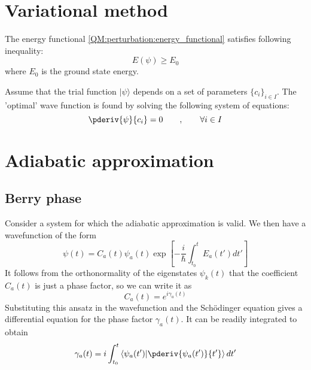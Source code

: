\section{Variational method}

    \begin{property}
    	The energy functional \ref{QM:perturbation:energy_functional} satisfies following inequality:
        \begin{equation}
        	E(\psi) \geq E_0
        \end{equation}
        where $E_0$ is the ground state energy.
    \end{property}
    
    \begin{method}
    	Assume that the trial function $|\psi\rangle$ depends on a set of parameters $\{c_i\}_{i\in I}$. The 'optimal' wave function is found by solving the following system of equations:
        \begin{equation}
        	\pderiv{\psi}{c_i} = 0\qquad,\qquad\forall i\in I
        \end{equation}
    \end{method}
    
\section{Adiabatic approximation}

	\subsection{Berry phase}
    	Consider a system for which the adiabatic approximation is valid. We then have a wavefunction of the form
        \begin{equation}
        	\psi(t) = C_a(t)\psi_a(t)\exp\left[-\frac{i}{\hbar}\int_{t_0}^tE_a(t')dt'\right]
        \end{equation}
    	It follows from the orthonormality of the eigenstates $\psi_k(t)$ that the coefficient $C_a(t)$ is just a phase factor, so we can write it as
        \begin{equation}
        	C_a(t) = e^{i\gamma_a(t)}
        \end{equation}
        Substituting this ansatz in the wavefunction and the Sch\"odinger equation gives a differential equation for the phase factor $\gamma_a(t)$. It can be readily integrated to obtain
        \begin{equation}
        	\label{QM:perturbation:berry:phase_factor}
        	\gamma_a(t) = i\int_{t_0}^t\left\langle\psi_a(t')|\pderiv{\psi_a(t')}{t'}\right\rangle dt'
        \end{equation}
        
